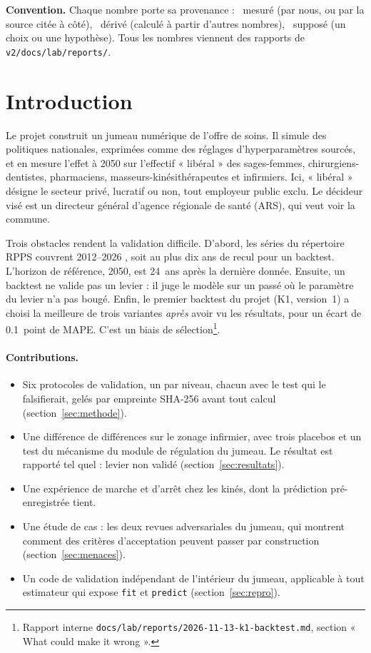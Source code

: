 \documentclass[11pt]{article}
\begin{document}
\medskip
\noindent\textbf{Convention.} Chaque nombre porte sa provenance : \mesure{}~mesuré (par nous, ou par
la source citée à côté), \derive{}~dérivé (calculé à partir d'autres nombres), \suppose{}~supposé
(un choix ou une hypothèse). Tous les nombres viennent des rapports de \texttt{v2/docs/lab/reports/}.

\section{Introduction}
Le projet construit un jumeau numérique de l'offre de soins. Il simule des politiques nationales,
exprimées comme des réglages d'hyperparamètres sourcés, et en mesure l'effet à 2050 sur l'effectif
« libéral » des sages-femmes, chirurgiens-dentistes, pharmaciens, masseurs-kinésithérapeutes et
infirmiers. Ici, « libéral » désigne le secteur privé, lucratif ou non, tout employeur public
exclu. Le décideur visé est un directeur général d'agence régionale de santé (ARS), qui veut voir la
commune.

Trois obstacles rendent la validation difficile. D'abord, les séries du répertoire RPPS couvrent
2012--2026 \citep{drees2026demo}, soit au plus dix ans de recul pour un backtest. L'horizon de
référence, 2050, est 24\derive{}~ans après la dernière donnée. Ensuite, un backtest ne valide pas un
levier : il juge le modèle sur un passé où le paramètre du levier n'a pas bougé. Enfin, le premier
backtest du projet (K1, version~1) a choisi la meilleure de trois variantes \emph{après} avoir vu les
résultats, pour un écart de \num{0.1}\mesure{}~point de MAPE. C'est un biais de
sélection\footnote{Rapport interne \texttt{docs/lab/reports/2026-11-13-k1-backtest.md}, section
« What could make it wrong ».}.

\paragraph{Contributions.}
\begin{itemize}
  \item Six protocoles de validation, un par niveau, chacun avec le test qui le falsifierait, gelés
        par empreinte SHA-256 avant tout calcul (section~\ref{sec:methode}).
  \item Une différence de différences sur le zonage infirmier, avec trois placebos et un test du
        mécanisme du module de régulation du jumeau. Le résultat est rapporté tel quel : levier
        non validé (section~\ref{sec:resultats}).
  \item Une expérience de marche et d'arrêt chez les kinés, dont la prédiction pré-enregistrée tient.
  \item Une étude de cas : les deux revues adversariales du jumeau, qui montrent comment des critères
        d'acceptation peuvent passer par construction (section~\ref{sec:menaces}).
  \item Un code de validation indépendant de l'intérieur du jumeau, applicable à tout estimateur
        qui expose \texttt{fit} et \texttt{predict} (section~\ref{sec:repro}).
\end{itemize}
\end{document}
